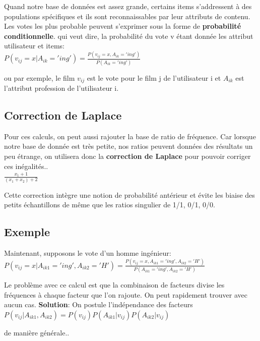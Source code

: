 \documentclass[oneside]{book}
\begin{document}
Quand notre base de données est assez grande, certains items s'addressent à des populations spécifiques et ils sont reconnaissables par leur attributs de contenu. Les votes les plus probable peuvent s'exprimer sous la forme de \textbf{probabilité conditionnelle}. qui veut dire, la probabilité du vote v étant donnée les attribut utilisateur et items:\\

\centering
$P(v_{ij} = x | A_{ik} = 'ing') = \frac{P(v_{ij} = x, A_{ik} = 'ing')}{P(A_{ik} = 'ing')}$
\justify

ou par exemple, le film $v_{ij}$ est le vote pour le film j de l'utilisateur i et $A_{ik}$ est l'attribut profession de l'utilisateur i. 
\subsection{Correction de Laplace}
Pour ces calculs, on peut aussi rajouter la base de ratio de fréquence. Car lorsque notre base de donnée est très petite, nos ratios peuvent données des résultats un peu étrange, on utilisera donc la \textbf{correction de Laplace} pour pouvoir corriger ces inégalités..\\

\centering
$\frac{x_1 + 1}{(x_1 + x_2) + 2}$\\
\justify

Cette correction intègre une notion de probabilité antérieur et évite les biaise des petits échantillons de même que les ratios singulier de 1/1, 0/1, 0/0. 

\subsection{Exemple}
Maintenant, supposons le vote d'un homme ingénieur:\\

\centering
$P(v_{ij} = x | A_{ik1} = 'ing', A_{ik2} = 'H') = 
\frac
{P(v_{ij} = x, A_{ik1} = 'ing', A_{ik2} = 'H')}
{P(A_{ik1} = 'ing', A_{ik2} = 'H')}$
\justify

Le problème avec ce calcul est que la combinaison de facteurs divise les fréquences à chaque facteur que l'on rajoute. On peut rapidement trouver avec aucun cas. \textbf{Solution}: On postule l'indépendance des facteurs\\

\centering
$P(v_{ij}|A_{ik1}, A_{ik2}) = P(v_{ij})P(A_{ik1}|v_{ij})P(A_{ik2}|v_{ij})$
\justify

de manière générale..\\
\end{document}
